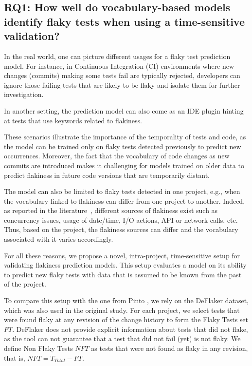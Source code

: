 \subsection{RQ1: How well do vocabulary-based models identify flaky tests when using a  time-sensitive validation?}
In the real world, one can picture different usages for a flaky test prediction model. 
For instance, in Continuous Integration (CI) environments where new changes (commits) making some tests fail are typically rejected, developers can ignore those failing tests that are likely to be flaky and isolate them for further investigation.

In another setting, the prediction model can also come as an IDE plugin hinting at tests that use keywords related to flakiness.

These scenarios illustrate the importance of the temporality of tests and code, as the model can be trained only on flaky tests detected previously to predict new occurrences.
Moreover, the fact that the vocabulary of code changes as new commits are introduced makes it challenging for models trained on older data to predict flakiness in future code versions that are temporarily distant.

The model can also be limited to flaky tests detected in one project, e.g., when 
the vocabulary linked to flakiness can differ from one project to another. 
Indeed, as reported in the literature~\cite{Luo2014,Lam2019RootCausing}, different sources of flakiness exist such as concurrency issues, usage of date/time, I/O actions, API or network calls, etc. 
Thus, based on the project, the flakiness sources can differ and the vocabulary associated with it varies accordingly.

For all these reasons, we propose a novel, intra-project, time-sensitive setup for validating flakiness prediction models.
This setup evaluates a model on its ability to predict new flaky tests with data that is assumed to be known from the past of the project.

To compare this setup with the one from Pinto \etal, we rely on the DeFlaker dataset, which was also used in the original study.
For each project, we select tests that were found flaky at any revision of the change history to form the Flaky Tests set $FT$. 
DeFlaker does not provide explicit information about tests that did not flake, as the tool can not guarantee that a test that did not fail (yet) is not flaky. 
We define Non Flaky Tests $NFT$ as tests that were not found as flaky in any revision, that is, $NFT = T_{Total} - FT$.

